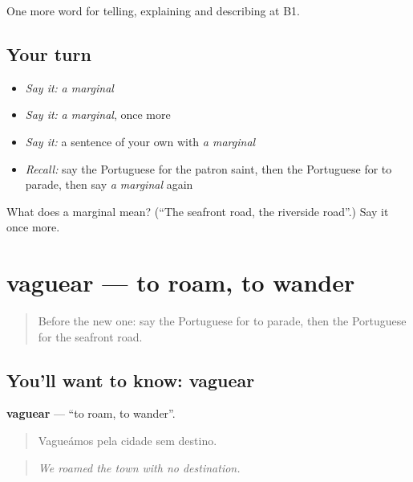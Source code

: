 \begin{grammarlens}[title={What you've built}]
One more word for telling, explaining and describing at B1.
\end{grammarlens}

\subsection*{Your turn}
\begin{itemize}
\raggedright
  \item \emph{Say it:} \emph{a marginal}
  \item \emph{Say it:} \emph{a marginal}, once more
  \item \emph{Say it:} a sentence of your own with \emph{a marginal}
  \item \emph{Recall:} say the Portuguese for the patron saint, then the Portuguese for to parade, then say \emph{a marginal} again
\end{itemize}

\begin{tcolorbox}[breakable,colback=teal!4,colframe=teal!35!black,title={Before you move on}]
What does a marginal mean? (\textquotedblleft{}The seafront road, the riverside road\textquotedblright{}.) Say it once more.
\end{tcolorbox}
\section[vaguear]{vaguear — to roam, to wander}

\label{lesson:PT-C447-vaguear}



\begin{quote}
Before the new one: say the Portuguese for to parade, then the Portuguese for the seafront road.
\end{quote}

\subsection*{You'll want to know: vaguear}
\textbf{vaguear} — \textquotedblleft{}to roam, to wander\textquotedblright{}.

\begin{quote}
Vagueámos pela cidade sem destino.
\end{quote}

\begin{quote}
\emph{We roamed the town with no destination.}
\end{quote}

